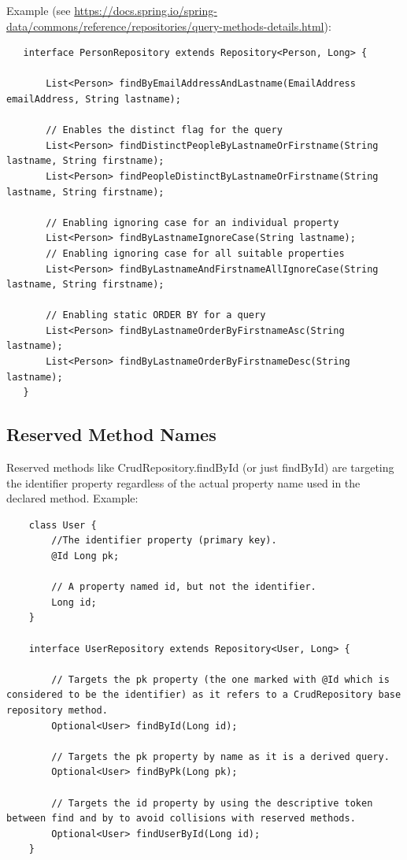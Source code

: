 \documentclass{scrartcl}
\begin{document}
Example (see \url{  https://docs.spring.io/spring-data/commons/reference/repositories/query-methods-details.html}):


\begin{lstlisting}
   interface PersonRepository extends Repository<Person, Long> {

       List<Person> findByEmailAddressAndLastname(EmailAddress emailAddress, String lastname);

       // Enables the distinct flag for the query
       List<Person> findDistinctPeopleByLastnameOrFirstname(String lastname, String firstname);
       List<Person> findPeopleDistinctByLastnameOrFirstname(String lastname, String firstname);

       // Enabling ignoring case for an individual property
       List<Person> findByLastnameIgnoreCase(String lastname);
       // Enabling ignoring case for all suitable properties
       List<Person> findByLastnameAndFirstnameAllIgnoreCase(String lastname, String firstname);

       // Enabling static ORDER BY for a query
       List<Person> findByLastnameOrderByFirstnameAsc(String lastname);
       List<Person> findByLastnameOrderByFirstnameDesc(String lastname);
   }
\end{lstlisting}

\subsection{Reserved Method Names}

    Reserved methods like CrudRepository.findById (or just findById) are targeting the identifier property regardless of the actual property name used in the declared method.
    Example:

\begin{lstlisting}
    class User {
        //The identifier property (primary key).
        @Id Long pk;

        // A property named id, but not the identifier.
        Long id;
    }

    interface UserRepository extends Repository<User, Long> {

        // Targets the pk property (the one marked with @Id which is considered to be the identifier) as it refers to a CrudRepository base repository method.
        Optional<User> findById(Long id);

        // Targets the pk property by name as it is a derived query.
        Optional<User> findByPk(Long pk);

        // Targets the id property by using the descriptive token between find and by to avoid collisions with reserved methods.
        Optional<User> findUserById(Long id);
    }

\end{lstlisting}
\end{document}
